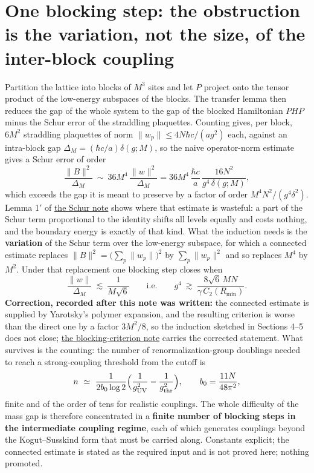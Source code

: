 \documentclass[11pt,a4paper]{article}
\begin{document}
\hypertarget{one-blocking-step-the-obstruction-is-the-variation-not-the-size-of-the-inter-block-coupling}{%
\section{One blocking step: the obstruction is the variation, not the
size, of the inter-block
coupling}\label{one-blocking-step-the-obstruction-is-the-variation-not-the-size-of-the-inter-block-coupling}}

Partition the lattice into blocks of \(M^3\) sites and let \(P\) project
onto the tensor product of the low-energy subspaces of the blocks. The
transfer lemma then reduces the gap of the whole system to the gap of
the blocked Hamiltonian \(PHP\) minus the Schur error of the straddling
plaquettes. Counting gives, per block, \(6M^2\) straddling plaquettes of
norm \(\|w_p\|\le4N\hbar c/(ag^2)\) each, against an intra-block gap
\(\Delta_M=(\hbar c/a)\delta(g;M)\), so the naive operator-norm estimate
gives a Schur error of order
\[\frac{\|B\|^2}{\Delta_M}\ \sim\ 36M^4\,\frac{\|w\|^2}{\Delta_M}
=36M^4\,\frac{\hbar c}{a}\,\frac{16N^2}{g^4\,\delta(g;M)},\] which
exceeds the gap it is meant to preserve by a factor of order
\(M^4N^2/(g^4\delta^2)\). Lemma 1\('\) of
\href{schur-error-ultraviolet.md}{the Schur note} shows where that
estimate is wasteful: a part of the Schur term proportional to the
identity shifts all levels equally and costs nothing, and the boundary
energy is exactly of that kind. What the induction needs is the
\textbf{variation} of the Schur term over the low-energy subspace, for
which a connected estimate replaces
\(\|B\|^2=\big(\sum_p\|w_p\|\big)^2\) by \(\sum_p\|w_p\|^2\) and so
replaces \(M^4\) by \(M^2\). Under that replacement one blocking step
closes when
\[\frac{\|w\|}{\Delta_M}\ \lesssim\ \frac1{M\sqrt6}\qquad\text{i.e.}\qquad
g^4\ \gtrsim\ \frac{8\sqrt6\,MN}{\gamma\,C_2(R_{\min})}.\]
\textbf{Correction, recorded after this note was written:} the connected
estimate is supplied by Yarotsky's polymer expansion, and the resulting
criterion is worse than the direct one by a factor \(3M^2/8\), so the
induction sketched in Sections 4--5 does not close;
\href{blocking-criterion-monotone.md}{the blocking-criterion note}
carries the corrected statement. What survives is the counting: the
number of renormalization-group doublings needed to reach a
strong-coupling threshold from the cutoff is
\[n\ \simeq\ \frac{1}{2b_0\log2}\Big(\frac1{g_{\rm UV}^2}-\frac1{g_{\rm thr}^2}\Big),
\qquad b_0=\frac{11N}{48\pi^2},\] finite and of the order of tens for
realistic couplings. The whole difficulty of the mass gap is therefore
concentrated in a \textbf{finite number of blocking steps in the
intermediate coupling regime}, each of which generates couplings beyond
the Kogut--Susskind form that must be carried along. Constants explicit;
the connected estimate is stated as the required input and is not proved
here; nothing promoted.
\end{document}
